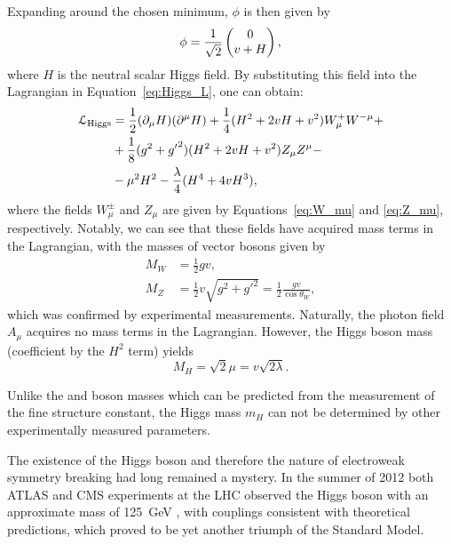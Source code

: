 Expanding around the chosen minimum, $\phi$ is then given by
\begin{equation}
\phi = \frac{1}{\sqrt{2}} \begin{pmatrix} 0 \\ v+H \end{pmatrix},
\end{equation}
where $H$ is the neutral scalar Higgs field. By substituting this field into the Lagrangian in
Equation~\ref{eq:Higgs_L}, one can obtain:
\begin{equation}
\begin{split}
\mathcal{L}_\textrm{Higgs} & = \frac{1}{2} (\partial_\mu H)(\partial^\mu H) + \frac{1}{4} (H^2 + 2vH + v^2) W^+_\mu W^{-\mu} + \\
& + \frac{1}{8} (g^2 + {g'}^2)(H^2 + 2vH + v^2)Z_\mu Z^\mu - \\
& - \mu^2 H^2 - \frac{\lambda}{4} (H^4 + 4vH^3),
\end{split}
\label{eq:Higgs_L_final}
\end{equation}
where the fields $W^{\pm}_\mu$ and $Z_\mu$ are given by Equations~\ref{eq:W_mu} and \ref{eq:Z_mu}, respectively.
Notably, we can see that these fields have acquired mass terms in the Lagrangian, with the masses of vector bosons given
by
\begin{subequations}
\begin{align}
M_W &= \frac{1}{2}gv, \\
M_Z &= \frac{1}{2}v\sqrt{g^2+{g'}^2} = \frac{1}{2} \frac{gv}{\cos{\theta_W}},
\end{align}
\end{subequations}
which was confirmed by experimental measurements. Naturally, the photon field $A_\mu$ acquires no mass terms in the
Lagrangian. However, the Higgs boson mass (coefficient by the $H^2$ term) yields
\begin{equation}
M_H = \sqrt{2} \mu = v \sqrt{2\lambda}.
\end{equation}

Unlike the \W and \Z boson masses which can be predicted from the measurement of the fine structure constant, the Higgs
mass $m_H$ can not be determined by other experimentally measured parameters.

The existence of the Higgs boson and therefore the nature of electroweak symmetry breaking had long remained a mystery.
In the summer of 2012 both ATLAS and CMS experiments at the LHC observed the Higgs boson with an approximate mass of
\SI{125}{\GeV} \autocite{ATLAS_higgs_observation, CMS_higgs_observation}, with couplings consistent with theoretical
predictions, which proved to be yet another triumph of the Standard Model.


